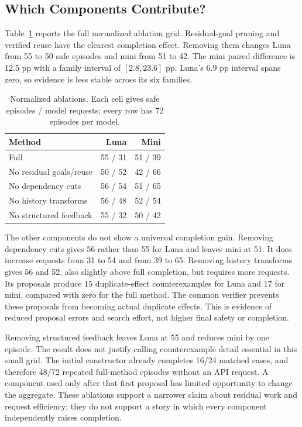 \subsection{Which Components Contribute?}
Table~\ref{tab:ablations} reports the full normalized ablation grid. Residual-goal pruning and verified reuse have the clearest completion effect. Removing them changes Luna from 55 to 50 safe episodes and mini from 51 to 42. The mini paired difference is 12.5 pp with a family interval of $[2.8,23.6]$ pp. Luna's 6.9 pp interval spans zero, so evidence is less stable across its six families.

\begin{table}[t]
\centering\caption{Normalized ablations. Each cell gives safe episodes / model requests; every row has 72 episodes per model.}\label{tab:ablations}
\begin{tabular}{lrr}\toprule
Method & Luna & Mini\\\midrule
Full & 55 / 31 & 51 / 39\\
No residual goals/reuse & 50 / 52 & 42 / 66\\
No dependency cuts & 56 / 54 & 51 / 65\\
No history transforms & 56 / 48 & 52 / 54\\
No structured feedback & 55 / 32 & 50 / 42\\\bottomrule
\end{tabular}
\end{table}

The other components do not show a universal completion gain. Removing dependency cuts gives 56 rather than 55 for Luna and leaves mini at 51. It does increase requests from 31 to 54 and from 39 to 65. Removing history transforms gives 56 and 52, also slightly above full completion, but requires more requests. Its proposals produce 15 duplicate-effect counterexamples for Luna and 17 for mini, compared with zero for the full method. The common verifier prevents these proposals from becoming actual duplicate effects. This is evidence of reduced proposal errors and search effort, not higher final safety or completion.

Removing structured feedback leaves Luna at 55 and reduces mini by one episode. The result does not justify calling counterexample detail essential in this small grid. The initial constructor already completes 16/24 matched cases, and therefore 48/72 repeated full-method episodes without an API request. A component used only after that first proposal has limited opportunity to change the aggregate. These ablations support a narrower claim about residual work and request efficiency; they do not support a story in which every component independently raises completion.

